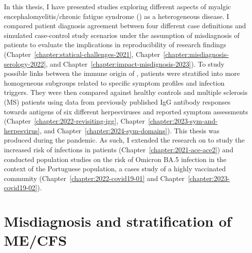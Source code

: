 In this thesis, I have presented studies exploring different aspects of myalgic encephalomyelitis/chronic fatigue syndrome (\cfs) as a heterogeneous disease.
I compared patient diagnosis agreement between four different case definitions and simulated case-control study scenarios under the assumption of misdiagnosis of patients to evaluate the implications in reproducibility of research findings (Chapter~\ref{chapter:statical-challenges-2021}, Chapter~\ref{chapter:misdiagnosis-serology-2022}, and Chapter~\ref{chapter:impact-misdignosis-2023}).
To study possible links between the immune origin of \cfs, patients were stratified into more homogeneous subgroups related to specific symptom profiles and infection triggers.
They were then compared against healthy controls and multiple sclerosis (MS) patients using data from previously published IgG antibody responses towards antigens of six different herpesviruses and reported symptom assessments
(Chapter~\ref{chapter:2022-revisiting-igg}, Chapter~\ref{chapter:2023-sym-and-herpesvirus}, and Chapter~\ref{chapter:2024-sym-domains}).
This thesis was produced during the \covid pandemic.
As such, I extended the research on \cfs to study the increased risk of \sars infections in \cfs patients (Chapter~\ref{chapter:2021-ace-ace2}) and conducted population studies on the risk of \sars Omicron BA.5 infection in the context of the Portuguese population, a cases study of a highly vaccinated community (Chapter~\ref{chapter:2022-covid19-01} and Chapter~\ref{chapter:2023-covid19-02}).

\section{Misdiagnosis and stratification of ME/CFS}

